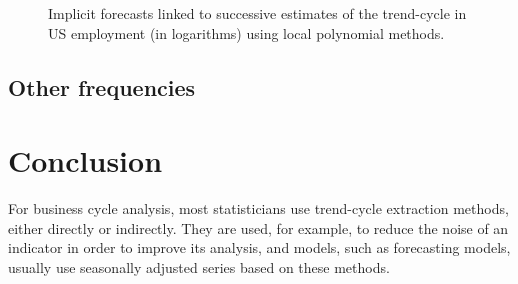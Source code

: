 \documentclass[
]{article}
\newcommand\1{\mathds{1}}
\begin{document}
\begin{figure}[H]

\caption{\label{fig-ce16ov-previmp-covid}Implicit forecasts linked to
successive estimates of the trend-cycle in US employment (in logarithms)
using local polynomial methods.}


\end{figure}%

\subsection{Other frequencies}\label{other-frequencies}

\section{Conclusion}\label{conclusion}

For business cycle analysis, most statisticians use trend-cycle
extraction methods, either directly or indirectly. They are used, for
example, to reduce the noise of an indicator in order to improve its
analysis, and models, such as forecasting models, usually use seasonally
adjusted series based on these methods.
\end{document}
